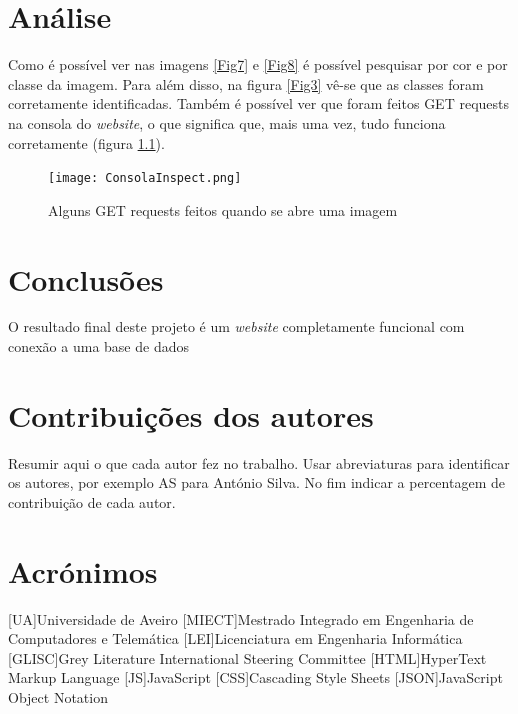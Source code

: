 \documentclass{report}
\begin{document}
\chapter{Análise}
\label{chap.analise}
Como é possível ver nas imagens \ref{Fig7} e \ref{Fig8} é possível pesquisar por cor e por classe da imagem. Para além disso, na figura \ref{Fig3} vê-se que as classes foram corretamente identificadas. Também é possível ver que foram feitos GET requests na consola do \textit{website}, o que significa que, mais uma vez, tudo funciona corretamente (figura \ref{Fig10}).

\begin{figure}[H]
\texttt{[image: ConsolaInspect.png]}
\caption{Alguns GET requests feitos quando se abre uma imagem}
\label{Fig10}
\end{figure}

\chapter{Conclusões}
\label{chap.conclusao}
O resultado final deste projeto é um \textit{website} completamente funcional com conexão a uma base de dados

\chapter*{Contribuições dos autores}
Resumir aqui o que cada autor fez no trabalho.
Usar abreviaturas para identificar os autores,
por exemplo AS para António Silva.
No fim indicar a percentagem de contribuição de cada autor.

\chapter*{Acrónimos}
\begin{acronym}
[UA]{Universidade de Aveiro}
[MIECT]{Mestrado Integrado em Engenharia de Computadores e Telemática}
[LEI]{Licenciatura em Engenharia Informática}
[GLISC]{Grey Literature International Steering Committee}
[HTML]{HyperText Markup Language}
[JS]{JavaScript}
[CSS]{Cascading Style Sheets}
[JSON]{JavaScript Object Notation}
\end{acronym}


\printbibliography
\end{document}
